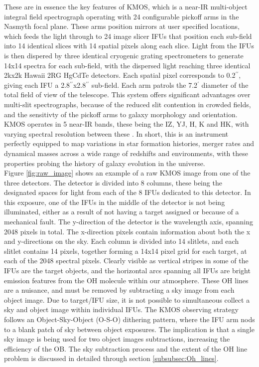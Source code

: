 \documentclass{literature}
\begin{document}
These are in essence the key features of KMOS, which is a near-IR multi-object integral field spectrograph operating with 24 configurable pickoff arms in the Nasmyth focal plane. These arms position mirrors at user specified locations, which feeds the light through to 24 image slicer IFUs that position each sub-field into 14 identical slices with 14 spatial pixels along each slice. Light from the IFUs is then dispered by three identical cryogenic grating spectrometers to generate 14x14 spectra for each sub-field, with the dispersed light reaching three identical 2kx2k Hawaii 2RG HgCdTe detectors. Each spatial pixel corresponds to 0.2$^{\prime \prime}$, giving each IFU a 2.8$^{\prime \prime}$x2.8$^{\prime \prime}$ sub-field. Each arm patrols the 7.2$^{\prime}$ diameter of the total field of view of the telescope. This system offers significant advantages over multi-slit spectrographs, because of the reduced slit contention in crowded fields, and the sensitivty of the pickoff arms to galaxy morphology and orientation. KMOS operates in 5 near-IR bands, these being the IZ, YJ, H, K and HK, with varying spectral resolution between these \citep{Sharples2005}. In short, this is an instrument perfectly equipped to map variations in star formation histories, merger rates and dynamical masses across a wide range of redshifts and environments, with these properties probing the history of galaxy evolution in the universe. \\ 

Figure \ref{fig:raw_image} shows an example of a raw KMOS image from one of the three detectors. The detector is divided into 8 columns, these being the designated spaces for light from each of the 8 IFUs dedicated to this detector. In this exposure, one of the IFUs in the middle of the detector is not being illuminated, either as a result of not having a target assigned or because of a mechanical fault. The y-direction of the detector is the wavelength axis, spanning 2048 pixels in total. The x-direction pixels contain information about both the x and y-directions on the sky. Each column is divided into 14 slitlets, and each slitlet contains 14 pixels, together forming a 14x14 pixel grid for each target, at each of the 2048 spectral pixels. Clearly visible as vertical stripes in some of the IFUs are the target objects, and the horizontal arcs spanning all IFUs are bright emission features from the OH molecule within our atmosphere. These OH lines are a nuisance, and must be removed by subtracting a sky image from each object image. Due to target/IFU size, it is not possible to simultaneous collect a sky and object image within individual IFUs. The KMOS observing strategy follows an Object-Sky-Object (O-S-O) dithering pattern, where the IFU arm nods to a blank patch of sky between object exposures. The implication is that a single sky image is being used for two object images subtractions, increasing the efficiency of the OB. The sky subtraction process and the extent of the OH line problem is discussed in detailed through section \ref{subsubsec:Oh_lines}.
\end{document}
